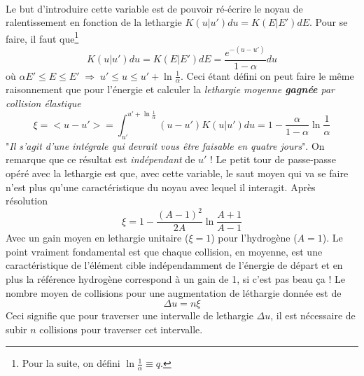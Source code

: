 	\ \\
	
	Le but d'introduire cette variable est de pouvoir ré-écrire le noyau de ralentissement en 
	fonction de la lethargie $K(u|u')du = K(E|E')dE$. Pour se faire, il faut que\footnote{Pour 
	la suite, on défini $\ln\frac{1}{\alpha}\equiv q$.}
	\begin{equation}
	K(u|u')du = K(E|E')dE  = \frac{{{e^{ - (u - u')}}}}{{1 - \alpha }}du
	\end{equation}
	où $\alpha E' \le E \le E'\; \Rightarrow \;u' \le u \le u' + \ln \frac{1}{\alpha }$. Ceci 
	étant défini on peut faire le même raisonnement que pour l'énergie et calculer la 
	\textit{lethargie moyenne \textbf{gagnée} par collision élastique}
	\begin{equation}
	\xi  =  < u - u' >  = \int_{u'}^{u' + \ln \frac{1}{\alpha }}   (u - u')K(u|u')du = 1 -
	 \frac{\alpha }{{1 - \alpha }}\ln \frac{1}{\alpha }
	\end{equation}
	"\textit{Il s'agit d'une intégrale qui devrait vous être faisable en quatre jours}". On 
	remarque que ce résultat est \textit{indépendant} de $u'$ ! Le petit tour de passe-passe 
	opéré avec la lethargie est que, avec cette variable, le saut moyen qui va se faire n'est 
	plus qu'une caractéristique du noyau avec lequel il interagit. Après résolution
	\begin{equation}
	\xi  = 1 - \frac{{{{(A - 1)}^2}}}{{2A}}\ln \frac{{A + 1}}{{A - 1}}
	\end{equation}
	Avec un gain moyen en lethargie unitaire ($\xi=1$) pour l'hydrogène ($A=1$). Le point vraiment
	fondamental est que chaque collision, en moyenne, est une caractéristique de l'élément cible 
	indépendamment de l'énergie de départ et en plus la référence hydrogène correspond à un gain
	de 1, si c'est pas beau ça ! Le nombre moyen de collisions pour une augmentation de léthargie
	donnée est de
	\begin{equation}
	\Delta u = n\xi
	\end{equation}
	Ceci signifie que pour traverser une intervalle de lethargie $\Delta u$, il est nécessaire 
	de subir $n$ collisions pour traverser cet intervalle. \\
	
